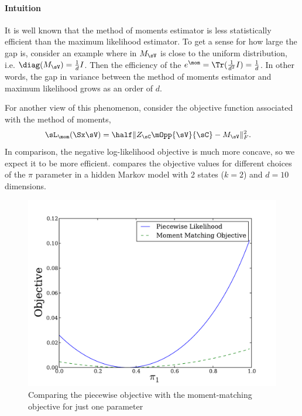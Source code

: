 \paragraph{Intuition}
It is well known that the method of moments estimator is less
  statistically efficient than the maximum likelihood estimator. 
To get a sense for how large the gap is, consider an example where in
  $M_\sV$ is close to the uniform distribution, i.e. $\diag(M_\sV)
  = \frac{1}{d} I$. 
Then the efficiency of the $e^\mom = \Tr(\frac{1}{d^2} I)
  = \frac{1}{d}$.
In other words, the gap in variance between the method of moments
  estimator and maximum likelihood grows as an order of $d$.

For another view of this phenomenon, consider the objective function
  associated with the method of moments, 
\begin{align*}
  \sL_\mom(\Sx \sV) &= \half \|Z_\sC \mOpp{\sV}{\sC} - M_\sV \|_F^2.
\end{align*}
In comparison, the negative log-likelihood objective is much more
concave, so we expect it to be more efficient. 
 compares the objective values for
different choices of the $\pi$ parameter in a hidden Markov model
 with 2 states ($k=2$) and $d=10$ dimensions.

\begin{figure}
  \centering
  \includegraphics[width=\columnwidth]{figures/piecewise-objective.pdf}
  \caption{Comparing the piecewise objective with the moment-matching objective for just one parameter}
  \label{fig:piecewise-objective}
\end{figure}

